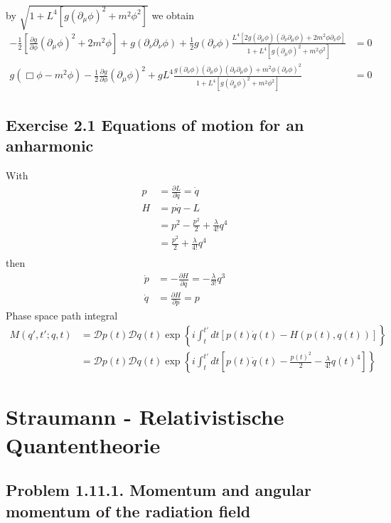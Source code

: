 \documentclass[10pt,a4paper]{book}
\theoremstyle{definition}
\begin{document}
by $\sqrt{1+L^4[g(\partial_\mu\phi)^2+m^2\phi^2]}$ we obtain
\begin{align}
-\frac{1}{2}\left[\frac{\partial g}{\partial\phi}(\partial_\mu\phi)^2+2m^2\phi\right]+g(\partial_\nu\partial_\nu\phi)+\frac{1}{2}g(\partial_\nu\phi)\frac{L^4[2g(\partial_\mu\phi)(\partial_\nu\partial_\mu\phi)+2m^2\phi\partial_\nu\phi]}{1+L^4[g(\partial_\mu\phi)^2+m^2\phi^2]}&=0\\
%
g(\Box\phi-m^2\phi)-\frac{1}{2}\frac{\partial g}{\partial\phi}(\partial_\mu\phi)^2+gL^4\frac{g(\partial_\nu\phi)(\partial_\mu\phi)(\partial_\nu\partial_\mu\phi)+m^2\phi(\partial_\nu\phi)^2}{1+L^4[g(\partial_\mu\phi)^2+m^2\phi^2]}&=0
\end{align}

\subsection{Exercise 2.1 Equations of motion for an anharmonic}
With
\begin{align}
p
&=\frac{\partial L}{\partial \dot{q}}=\dot{q}\\
H
&=p\dot{q}-L\\
&=p^2-\frac{p^2}{2}+\frac{\lambda}{4!}q^4\\
&=\frac{p^2}{2}+\frac{\lambda}{4!}q^4\\
\end{align}
then
\begin{align}
\dot{p}&=-\frac{\partial H}{\partial q}=-\frac{\lambda}{3!}q^3\\
\dot{q}&=\frac{\partial H}{\partial p}=p
\end{align}
Phase space path integral
\begin{align}
M(q',t';q,t)
&=\mathcal{D}p(t)\mathcal{D}q(t)\exp\left\{i\int_t^{t'}dt[p(t)\dot{q}(t)-H(p(t),q(t))]\right\}\\
&=\mathcal{D}p(t)\mathcal{D}q(t)\exp\left\{i\int_t^{t'}dt[p(t)\dot{q}(t)-\frac{p(t)^2}{2}-\frac{\lambda}{4!}q(t)^4]\right\}
\end{align}

\section{{\sc Straumann} - Relativistische Quantentheorie} 
\subsection{Problem 1.11.1. Momentum and angular momentum of the radiation field}
\end{document}

